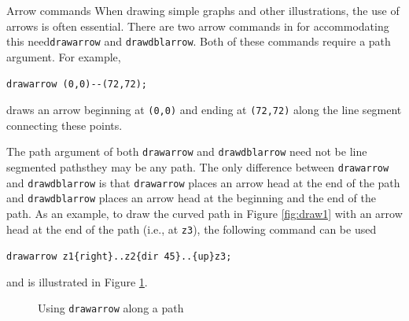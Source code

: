 \begin{subsection}{Arrow commands}
When drawing simple graphs and other illustrations, the use of arrows is often essential.  There are two arrow commands in \MP{} for accommodating this need\Dash \texttt{drawarrow} and \texttt{drawdblarrow}.  Both of these commands require a path argument.  For example, \begin{center}\verb|drawarrow (0,0)--(72,72);|\end{center} draws an arrow beginning at \verb|(0,0)| and ending at \verb|(72,72)| along the line segment connecting these points.

The path argument of both \texttt{drawarrow} and \texttt{drawdblarrow} need not be line segmented paths\Dash they may be any \MP{} path.  The only difference between \texttt{drawarrow} and \texttt{drawdblarrow} is that \texttt{drawarrow} places an arrow head at the end of the path and \texttt{drawdblarrow} places an arrow head at the beginning and the end of the path.  As an example, to draw the curved path in Figure \ref{fig:draw1} with an arrow head at the end of the path (i.e., at \texttt{z3}), the following command can be used \begin{center}\verb|drawarrow z1{right}..z2{dir 45}..{up}z3;|\end{center} and is illustrated in Figure \ref{fig:draw2}.
\begin{figure}[ht]
	\begin{center}\end{center}
	\caption{Using \texttt{drawarrow} along a path}\label{fig:draw2}
\end{figure}
\end{subsection}
